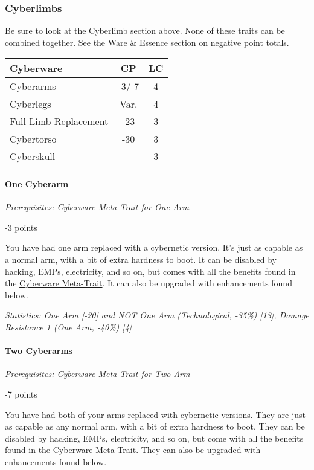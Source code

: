 \begin{multicols*}{3}
	\subsubsection{Cyberlimbs}
	
	Be sure to look at the Cyberlimb section above. None of these traits can be combined together. See the \hyperref[ware]{Ware \& Essence} section on negative point totals.
	
	\begin{center}
		\begin{tabularx}{0.32\textwidth}{|X|c|c|}
			\hline
			Cyberware & CP & LC\\
			\hline
			\hline
			Cyberarms & -3/-7 & 4 \\
			Cyberlegs & Var. & 4 \\
			Full Limb Replacement & -23 & 3 \\
			Cybertorso & -30 & 3 \\
			Cyberskull & & 3 \\
			\hline
		\end{tabularx}
	\end{center}
	
	\paragraph{One Cyberarm}
	\textit{Prerequisites:  Cyberware Meta-Trait for One Arm}
	\begin{flushright}
		-3 points
	\end{flushright}
	
	You have had one arm replaced with a cybernetic version. It's just as capable as a normal arm, with a bit of extra hardness to boot. It can be disabled by hacking, EMPs, electricity, and so on, but comes with all the benefits found in the \hyperref[cyberware-meta-trait]{Cyberware Meta-Trait}. It can also be upgraded with enhancements found below.
	
	\textit{\textcolor{OliveGreen}{Statistics: One Arm [-20] and NOT One Arm (Technological, -35\%) [13], Damage Resistance 1 (One Arm, -40\%) [4]}}
	
	\paragraph{Two Cyberarms}
	\textit{Prerequisites:  Cyberware Meta-Trait for Two Arm}
	\begin{flushright}
		-7 points
	\end{flushright}
	
	You have had both of your arms replaced with cybernetic versions. They are just as capable as any normal arm, with a bit of extra hardness to boot. They can be disabled by hacking, EMPs, electricity, and so on, but come with all the benefits found in the \hyperref[cyberware-meta-trait]{Cyberware Meta-Trait}. They can also be upgraded with enhancements found below.
	

\end{multicols*}

